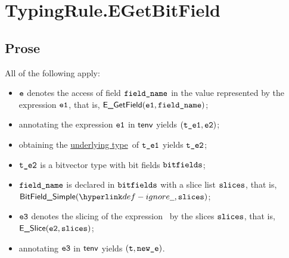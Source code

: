 \documentclass{book}
\newcommand\ProseOrTypeError[0]{\ProseTerminateAs{\TypeErrorConfig}}
\newcommand\underlyingtype[0]{\hyperlink{def-underlyingtype}{underlying type}}
\begin{document}

\section{TypingRule.EGetBitField \label{sec:TypingRule.EGetBitField}}

\subsection{Prose}
All of the following apply:
\begin{itemize}
  \item $\texttt{e}$ denotes the access of field $\texttt{field\_name}$ in the value represented by the expression $\texttt{e1}$, that is, $\textsf{E\_GetField}(\texttt{e1}, \texttt{field\_name})$;
  \item annotating the expression $\texttt{e1}$ in $\textsf{tenv}$ yields $(\texttt{t\_e1}, \texttt{e2})$\ProseOrTypeError;
  \item obtaining the \underlyingtype\ of $\texttt{t\_e1}$ yields $\texttt{t\_e2}$\ProseOrTypeError;
  \item $\texttt{t\_e2}$ is a bitvector type with bit fields $\texttt{bitfields}$;
  \item $\texttt{field\_name}$ is declared in $\texttt{bitfields}$ with a slice list $\texttt{slices}$, that is, \\ $\BitFieldSimple(\Ignore, \slices)$;
  \item $\texttt{e3}$ denotes the slicing of the expression \vetwo\ by the slices $\texttt{slices}$, that is, \\ $\textsf{E\_Slice}(\texttt{e2}, \texttt{slices})$;
  \item annotating $\texttt{e3}$ in $\textsf{tenv}$ yields $(\texttt{t}, \texttt{new\_e})$\ProseOrTypeError.
\end{itemize}


\end{document}
